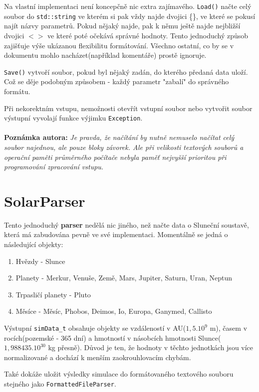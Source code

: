 Na vlastní implementaci není koncepčně nic extra zajímavého. \texttt{Load()} načte celý soubor do \texttt{std::string} ve kterém si pak vždy najde dvojici \{\}, ve které se pokusí najít názvy parametrů. Pokud nějaký najde, pak k němu ještě najde nejbližší dvojici $ <> $  ve které poté očekává správné hodnoty. Tento jednoduchý způsob zajišťuje výše ukázanou flexibilitu formátování. Všechno ostatní, co by se v dokumentu mohlo nacházet(například komentáře) prostě ignoruje. 

\texttt{Save()} vytvoří soubor, pokud byl nějaký zadán, do kterého předaná data uloží. Což se děje podobným způsobem - každý parametr "zabalí" do správného formátu.

Při nekorektním vstupu, nemožnosti otevřít vstupní soubor nebo vytvořit soubor výstupní vyvolají funkce výjimku \texttt{Exception}.
\\
\\
\textbf{Poznámka autora:}
\textit{Je pravda, že načítání by nutně nemuselo načítat celý soubor najednou, ale pouze  bloky závorek. Ale při velikosti textových souborů a operační paměti průměrného počítače nebyla paměť nejvyšší prioritou při programování zpracování vstupu.}


\chapter{SolarParser}
Tento jednoduchý \textbf{parser} nedělá nic jiného, než načte data o Sluneční soustavě, která má zabudována pevně ve své implementaci.
Momentálně se jedná o následující objekty:
\begin{enumerate}
	\item Hvězdy - Slunce
	\item Planety - Merkur, Venuše, Země, Mars, Jupiter, Saturn, Uran, Neptun
	\item Trpasličí planety - Pluto
	\item Měsíce - Měsíc, Phobos, Deimos, Io, Europa, Ganymed, Callisto
\end{enumerate}
Výstupní \texttt{simData\_t} obsahuje objekty se vzdáleností v AU($ 1,5.10^9 $ m), časem v rocích(pozemské - 365 dní) a hmotností v násobcích hmotnosti Slunce($ 1,988435.10^{30} $ kg přesně). Důvod je ten, že hodnoty v těchto jednotkách jsou více normalizované a dochází k menším zaokrouhlovacím chybám.

Také dokáže uložit výsledky simulace do formátovaného textového souboru stejného jako \texttt{FormattedFileParser}.